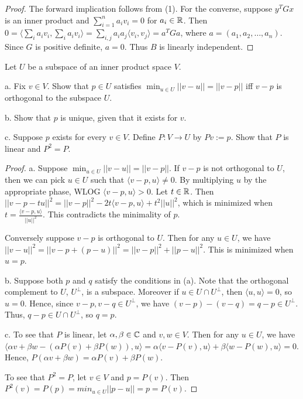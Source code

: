 \documentclass{article}
\begin{document}
\begin{proof}
The forward implication follows from (1).  For the converse, suppose $y^T G x$ is an inner product and $\sum_{i=1}^n a_i v_i = 0$ for $a_i \in \mathbb{R}$. Then $0 = \langle \sum_i a_i v_i , \sum_i a_i v_i \rangle 
= \sum_{i,j} a_i a_j \langle v_i, v_j \rangle
=  a^T G a$,
where $a = (a_1, a_2, \ldots, a_n)$.  Since $G$ is positive definite, $a = 0$. Thus $B$ is linearly independent.
\end{proof}

 Let $U$ be a subspace of an inner product space $V$.

a. Fix $v \in V$. Show that $p \in U$ satisfies $\min_{u \in U} ||v - u || = || v - p||$ iff $v - p$ is orthogonal to the subspace $U$.

b. Show that $p$ is unique, given that it exists for $v$.

c. Suppose $p$ exists for every $v \in V$. Define $P: V \to U$ by $Pv := p$. Show that $P$ is linear and $P^2 = P$.

\begin{proof}
a. Suppose $\min_{u \in U} ||v - u || = || v - p||$.  If $v-p$ is not orthogonal to $U$, then we can pick $u \in U$ such that $\langle v - p, u \rangle \ne 0$. By multiplying $u$ by the appropriate phase, WLOG $\langle v - p , u \rangle > 0$.  Let $t \in \mathbb{R}$. Then 
$||v - p - tu||^2 
= ||v - p||^2  - 2t \langle v - p , u \rangle + t^2 ||u||^2$, 
which is minimized when $t = \frac {\langle v - p , u \rangle} {||u||^2}$.  This contradicts the minimality of $p$.

Conversely suppose $v - p$ is orthogonal to $U$. Then for any $u \in U$, we have $||v - u||^2 = || v - p + (p-u)||^2 
= ||v - p||^2 + ||p - u||^2$.  This is minimized when $u = p$.

b. Suppose both $p$ and $q$ satisfy the conditions in (a).  Note that the orthogonal complement to $U$, $U^\perp$, is a subspace. Moreover if $u \in U \cap U^\perp$, then $\langle u, u \rangle = 0$, so $u = 0$.  Hence, since $v - p, v - q \in U^\perp$, we have $(v-p) - (v-q) = q-p \in U^\perp$.  Thus, $q-p \in U \cap U^\perp$, so $q = p$.

c. To see that $P$ is linear, let $\alpha, \beta \in \mathbb{C}$ and $v,w \in V$.  Then for any $u \in U$, we have $\langle \alpha v + \beta w - (\alpha P(v) + \beta P(w)), u \rangle 
= \alpha\langle v - P(v), u\rangle + \beta \langle w - P(w), u \rangle
= 0$.  Hence, $P(\alpha v + \beta w) = \alpha P(v) + \beta P(w)$.

To see that $P^2 = P$,  let $v \in V$ and $p = P(v)$.  Then $P^2(v) = P(p) = min_{u\in U} || p - u || = p = P(v)$.
\end{proof}
\end{document}
